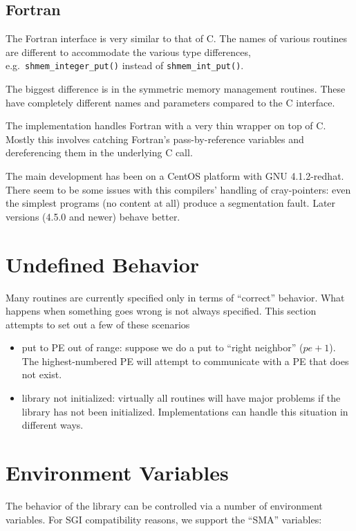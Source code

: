 \subsection{Fortran}

The Fortran interface is very similar to that of C. The names of
various routines are different to accommodate the various type
differences, e.g.\ \texttt{shmem\_integer\_put()} instead of
\texttt{shmem\_int\_put()}.

The biggest difference is in the symmetric memory management routines.
These have completely different names and parameters compared to the C
interface.

The \openshmem implementation handles Fortran with a very thin wrapper
on top of C. Mostly this involves catching Fortran's pass-by-reference
variables and dereferencing them in the underlying C call.

The main development has been on a CentOS platform with GNU
4.1.2-redhat.  There seem to be some issues with this compilers'
handling of cray-pointers: even the simplest programs (no \openshmem
content at all) produce a segmentation fault. Later versions
(4.5.0 and newer) behave better.

\section{Undefined Behavior}

Many routines are currently specified only in terms of ``correct''
behavior. What happens when something goes wrong is not always
specified.  This section attempts to set out a few of these scenarios
\begin{itemize}
\item put to PE out of range: suppose we do a put to ``right
neighbor'' (\(pe + 1\)). The highest-numbered PE will attempt to
communicate with a PE that does not exist.
\item library not initialized: virtually all \openshmem routines will
have major problems if the library has not been
initialized. Implementations can handle this situation in different
ways.
\end{itemize}

\section{Environment Variables\label{sec:Environment-Variables}}

The behavior of the \openshmem library can be controlled via a number
of environment variables. For SGI compatibility reasons, we support
the ``SMA'' variables:


